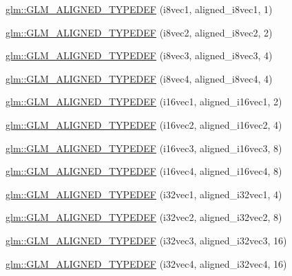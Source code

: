 \begin{DoxyCompactItemize}
\item 
\hyperlink{group__gtx__type__aligned_ga9ec20fdfb729c702032da9378c79679f}{glm\+::\+G\+L\+M\+\_\+\+A\+L\+I\+G\+N\+E\+D\+\_\+\+T\+Y\+P\+E\+D\+E\+F} (i8vec1, aligned\+\_\+i8vec1, 1)
\item 
\hyperlink{group__gtx__type__aligned_ga25b3fe1d9e8d0a5e86c1949c1acd8131}{glm\+::\+G\+L\+M\+\_\+\+A\+L\+I\+G\+N\+E\+D\+\_\+\+T\+Y\+P\+E\+D\+E\+F} (i8vec2, aligned\+\_\+i8vec2, 2)
\item 
\hyperlink{group__gtx__type__aligned_ga2958f907719d94d8109b562540c910e2}{glm\+::\+G\+L\+M\+\_\+\+A\+L\+I\+G\+N\+E\+D\+\_\+\+T\+Y\+P\+E\+D\+E\+F} (i8vec3, aligned\+\_\+i8vec3, 4)
\item 
\hyperlink{group__gtx__type__aligned_ga1fe6fc032a978f1c845fac9aa0668714}{glm\+::\+G\+L\+M\+\_\+\+A\+L\+I\+G\+N\+E\+D\+\_\+\+T\+Y\+P\+E\+D\+E\+F} (i8vec4, aligned\+\_\+i8vec4, 4)
\item 
\hyperlink{group__gtx__type__aligned_gaa4161e7a496dc96972254143fe873e55}{glm\+::\+G\+L\+M\+\_\+\+A\+L\+I\+G\+N\+E\+D\+\_\+\+T\+Y\+P\+E\+D\+E\+F} (i16vec1, aligned\+\_\+i16vec1, 2)
\item 
\hyperlink{group__gtx__type__aligned_ga9d7cb211ccda69b1c22ddeeb0f3e7aba}{glm\+::\+G\+L\+M\+\_\+\+A\+L\+I\+G\+N\+E\+D\+\_\+\+T\+Y\+P\+E\+D\+E\+F} (i16vec2, aligned\+\_\+i16vec2, 4)
\item 
\hyperlink{group__gtx__type__aligned_gaaee91dd2ab34423bcc11072ef6bd0f02}{glm\+::\+G\+L\+M\+\_\+\+A\+L\+I\+G\+N\+E\+D\+\_\+\+T\+Y\+P\+E\+D\+E\+F} (i16vec3, aligned\+\_\+i16vec3, 8)
\item 
\hyperlink{group__gtx__type__aligned_ga49f047ccaa8b31fad9f26c67bf9b3510}{glm\+::\+G\+L\+M\+\_\+\+A\+L\+I\+G\+N\+E\+D\+\_\+\+T\+Y\+P\+E\+D\+E\+F} (i16vec4, aligned\+\_\+i16vec4, 8)
\item 
\hyperlink{group__gtx__type__aligned_ga904e9c2436bb099397c0823506a0771f}{glm\+::\+G\+L\+M\+\_\+\+A\+L\+I\+G\+N\+E\+D\+\_\+\+T\+Y\+P\+E\+D\+E\+F} (i32vec1, aligned\+\_\+i32vec1, 4)
\item 
\hyperlink{group__gtx__type__aligned_gaf90651cf2f5e7ee2b11cfdc5a6749534}{glm\+::\+G\+L\+M\+\_\+\+A\+L\+I\+G\+N\+E\+D\+\_\+\+T\+Y\+P\+E\+D\+E\+F} (i32vec2, aligned\+\_\+i32vec2, 8)
\item 
\hyperlink{group__gtx__type__aligned_ga7354a4ead8cb17868aec36b9c30d6010}{glm\+::\+G\+L\+M\+\_\+\+A\+L\+I\+G\+N\+E\+D\+\_\+\+T\+Y\+P\+E\+D\+E\+F} (i32vec3, aligned\+\_\+i32vec3, 16)
\item 
\hyperlink{group__gtx__type__aligned_gad2ecbdea18732163e2636e27b37981ee}{glm\+::\+G\+L\+M\+\_\+\+A\+L\+I\+G\+N\+E\+D\+\_\+\+T\+Y\+P\+E\+D\+E\+F} (i32vec4, aligned\+\_\+i32vec4, 16)

\end{DoxyCompactItemize}
